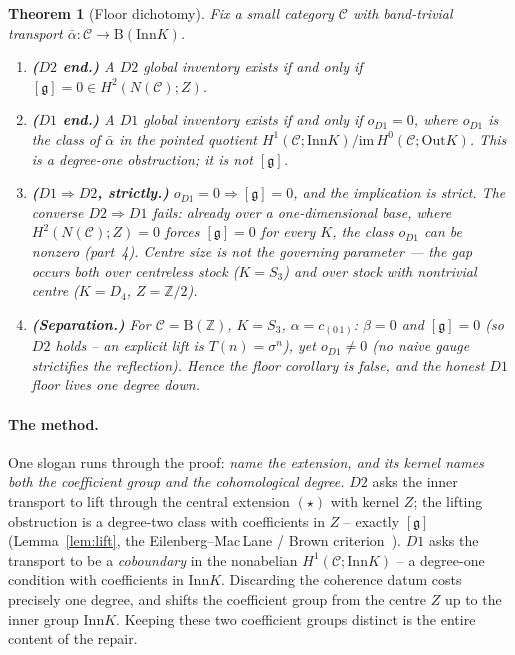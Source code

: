 \documentclass[11pt]{article}
\newtheorem{theorem}{Theorem}
\theoremstyle{definition}
\newcommand{\C}{\mathcal{C}}
\newcommand{\Z}{\mathbb{Z}}
\newcommand{\Inn}{\mathrm{Inn}}
\newcommand{\Out}{\mathrm{Out}}
\newcommand{\gerbe}{\mathfrak{g}}
\newcommand{\abar}{\bar{\alpha}}
\newcommand{\B}{\mathrm{B}}
\begin{document}
\begin{theorem}[Floor dichotomy]\label{thm:main}
Fix a small category $\C$ with band-trivial transport $\abar\colon\C\to\B(\Inn K)$.
\begin{enumerate}
\item \textbf{($D2$ end.)} A $D2$ global inventory exists if and only if
$[\gerbe]=0\in H^2(N(\C);Z)$.
\item \textbf{($D1$ end.)} A $D1$ global inventory exists if and only if $o_{D1}=0$, where
$o_{D1}$ is the class of $\abar$ in the pointed quotient
$H^1(\C;\Inn K)/\mathrm{im}\,H^0(\C;\Out K)$. This is a \emph{degree-one} obstruction; it
is not $[\gerbe]$.
\item \textbf{($D1\Rightarrow D2$, strictly.)} $o_{D1}=0\Rightarrow[\gerbe]=0$, and the
implication is strict. The converse $D2\Rightarrow D1$ fails: already over a one-dimensional
base, where $H^2(N(\C);Z)=0$ forces $[\gerbe]=0$ for every $K$, the class $o_{D1}$ can be
nonzero (part~4). Centre size is not the governing parameter --- the gap occurs both over
centreless stock ($K=S_3$) and over stock with nontrivial centre ($K=D_4$, $Z=\Z/2$).
\item \textbf{(Separation.)} For $\C=\B(\Z)$, $K=S_3$, $\alpha=c_{(0\,1)}$: $\beta=0$ and
$[\gerbe]=0$ (so $D2$ holds -- an explicit lift is $T(n)=\sigma^n$), yet $o_{D1}\neq 0$
(no naive gauge strictifies the reflection). Hence the floor corollary is false, and the
honest $D1$ floor lives one degree down.
\end{enumerate}
\end{theorem}

\paragraph{The method.} One slogan runs through the proof: \emph{name the extension, and
its kernel names both the coefficient group and the cohomological degree.} $D2$ asks the
inner transport to lift through the central extension $(\star)$ with kernel $Z$; the
lifting obstruction is a degree-two class with coefficients in $Z$ -- exactly $[\gerbe]$
(Lemma~\ref{lem:lift}, the Eilenberg--Mac\,Lane / Brown criterion~\cite{eml,brown}). $D1$
asks the transport to be a \emph{coboundary} in the nonabelian $H^1(\C;\Inn K)$ -- a
degree-one condition with coefficients in $\Inn K$. Discarding the coherence datum costs
precisely one degree, and shifts the coefficient group from the centre $Z$ up to the inner
group $\Inn K$. Keeping these two coefficient groups distinct is the entire content of the
repair.
\end{document}
